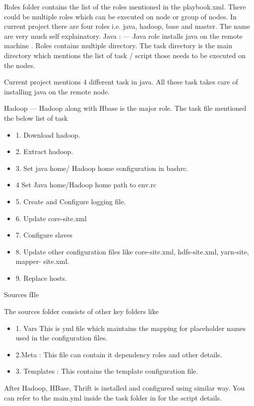 \documentclass[9pt,twocolumn,twoside]{../../styles/osajnl}
\begin{document}
Roles folder contains the list of the roles mentioned in the playbook.xml. There could be multiple roles which can be executed on node or group of nodes.
In current project there are four roles i.e. java, hadoop, base and master. The name are very much self explainatory.
Java : — Java role installs java on the remote machine . Roles contains multiple directory. The task directory is the main directory which mentions the list of task / script 
those needs to be executed on the nodes.

Current project mentions 4 different task in java. All these task takes care of installing java on the remote node.

Hadoop — Hadoop along with Hbase is the major role. The task file mentioned the below list of task
\begin{itemize}
\item 1. Download hadoop.
\item 2. Extract hadoop.
\item 3. Set java home/ Hadoop home configuration in bashrc.
\item 4 Set Java home/Hadoop home path to env.rc
\item 5. Create and Configure logging file.
\item 6. Update core-site.xml
\item 7. Configure slaves
\item 8. Update other configuration files like core-site.xml, hdfs-site.xml, yarn-site, mapper- site.xml.
\item 9. Replace hosts.
\end{itemize}

Sources fIle

The sources folder consists of other key folders like

\begin{itemize}
\item 1. Vars This is yml file which maintains the mapping for placeholder names used in the configuration files.
\item 2.Meta : This file can contain it dependency roles and other details.
\item 3. Templates : This contains the template configuration file.
\end{itemize}

After Hadoop, HBase, Thrift is installed and configured using similar way. You can refer to the main.yml inside the task folder in for the script details.
\end{document}
